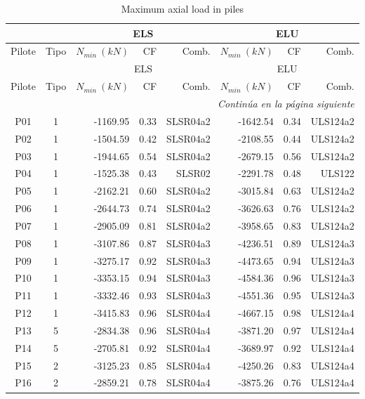 
\begin{center}
\begin{longtable}{|c|c|rrr|rrr|}
\caption{Maximum axial load in piles} \label{tab:axil_pilotes} \\
\hline
       &      & \multicolumn{3}{|c|}{ELS} & \multicolumn{3}{c|}{ELU}\\
\hline
Pilote & Tipo & $N_{min}\ (kN)$ & CF & Comb. &  $N_{min}\ (kN)$ & CF & Comb.\\
\endfirsthead
\hline
       &      & \multicolumn{3}{|c|}{ELS} & \multicolumn{3}{c|}{ELU}\\
\hline
Pilote & Tipo & $N_{min}\ (kN)$ & CF & Comb. &  $N_{min}\ (kN)$ & CF & Comb.\\
\endhead
\hline 
\multicolumn{8}{r}{\emph{Continúa en la página siguiente}} \\
\endfoot
\hline 
\endlastfoot
P01 & 1 & -1169.95 & 0.33 & SLSR04a2 & -1642.54 & 0.34 & ULS124a2\\
P02 & 1 & -1504.59 & 0.42 & SLSR04a2 & -2108.55 & 0.44 & ULS124a2\\
P03 & 1 & -1944.65 & 0.54 & SLSR04a2 & -2679.15 & 0.56 & ULS124a2\\
P04 & 1 & -1525.38 & 0.43 & SLSR02 & -2291.78 & 0.48 & ULS122\\
P05 & 1 & -2162.21 & 0.60 & SLSR04a2 & -3015.84 & 0.63 & ULS124a2\\
P06 & 1 & -2644.73 & 0.74 & SLSR04a2 & -3626.63 & 0.76 & ULS124a2\\
P07 & 1 & -2905.09 & 0.81 & SLSR04a2 & -3958.65 & 0.83 & ULS124a2\\
P08 & 1 & -3107.86 & 0.87 & SLSR04a3 & -4236.51 & 0.89 & ULS124a3\\
P09 & 1 & -3275.17 & 0.92 & SLSR04a3 & -4473.65 & 0.94 & ULS124a3\\
P10 & 1 & -3353.15 & 0.94 & SLSR04a3 & -4584.36 & 0.96 & ULS124a3\\
P11 & 1 & -3332.46 & 0.93 & SLSR04a3 & -4551.36 & 0.95 & ULS124a3\\
P12 & 1 & -3415.83 & 0.96 & SLSR04a4 & -4667.15 & 0.98 & ULS124a4\\
P13 & 5 & -2834.38 & 0.96 & SLSR04a4 & -3871.20 & 0.97 & ULS124a4\\
P14 & 5 & -2705.81 & 0.92 & SLSR04a4 & -3689.97 & 0.92 & ULS124a4\\
P15 & 2 & -3125.23 & 0.85 & SLSR04a4 & -4250.26 & 0.83 & ULS124a4\\
P16 & 2 & -2859.21 & 0.78 & SLSR04a4 & -3875.26 & 0.76 & ULS124a4\\

\end{longtable}
\end{center}
